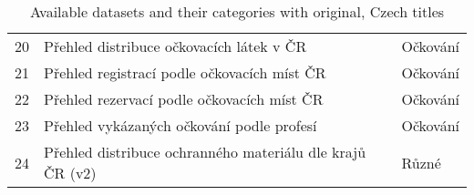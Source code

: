 \begin{table}[htbp]
\begin{longtable}{@{}rp{10cm}l@{}}
        20 & Přehled distribuce očkovacích látek v ČR                                                                                                                            & Očkování                          \\
        21 & Přehled registrací podle očkovacích míst ČR                                                                                                                         & Očkování                          \\
        22 & Přehled rezervací podle očkovacích míst ČR                                                                                                                          & Očkování                          \\
        23 & Přehled vykázaných očkování podle profesí                                                                                                                           & Očkování                          \\
        24 & Přehled distribuce ochranného materiálu dle krajů ČR (v2)                                                                                                           & Různé                             \\
        \bottomrule
    \end{longtable}

    \caption{Available datasets and their categories with original, Czech titles}
    \label{table:available-datasets}
\end{table}
